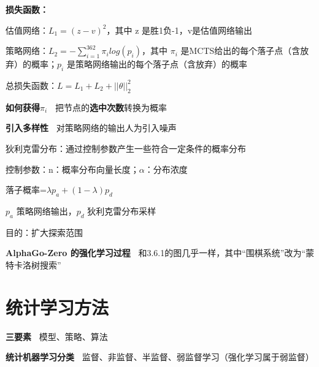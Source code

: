 \documentclass[b4paper, 10pt]{ctexart}
\begin{document}
\begin{multicols}{3}
\textbf{损失函数：}

估值网络：$L_1 = (z-v)^2$，其中 z 是胜1负-1，v是估值网络输出

策略网络：$L_2 = -\sum_{i=1}^{362} \pi_i log(p_i)$，其中 $\pi_i$ 是MCTS给出的每个落子点（含放弃）的概率；$p_i$ 是策略网络输出的每个落子点（含放弃）的概率

总损失函数：$L=L_1+L_2+||\theta||^2_2$

\textbf{如何获得$\pi_i$\ } 把节点的\textbf{选中次数}转换为概率

\textbf{引入多样性\ } 对策略网络的输出人为引入噪声

狄利克雷分布：通过控制参数产生一些符合一定条件的概率分布

控制参数：n：概率分布向量长度；$\alpha$：分布浓度

落子概率=$\lambda p_a+(1-\lambda)p_d$

$p_a$ 策略网络输出，$p_d$ 狄利克雷分布采样

目的：扩大探索范围

\textbf{AlphaGo-Zero 的强化学习过程\ } 和3.6.1的图几乎一样，其中“围棋系统”改为“蒙特卡洛树搜索”


\section{统计学习方法}



\textbf{三要素\ } 模型、策略、算法

\textbf{统计机器学习分类\ } 监督、非监督、半监督、弱监督学习（强化学习属于弱监督）


\end{multicols}
\end{document}
